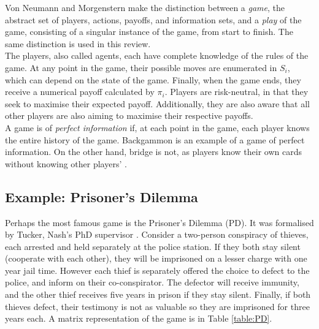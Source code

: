 

 Von Neumann and Morgenstern make the distinction between a \emph{game}, the abstract set of players, actions, payoffs, and information sets, and a \emph{play} of the game, consisting of a singular instance of the game, from start to finish. The same distinction is used in this review. \\



The players, also called agents, each have complete knowledge of the rules of the game. At any point in the game, their possible moves are enumerated in $S_i$, which can depend on the state of the game. Finally, when the game ends, they receive a numerical payoff calculated by $\pi_i$. Players are risk-neutral, in that they seek to maximise their expected payoff. Additionally, they are also aware that all other players are also aiming to maximise their respective payoffs.\\

A game is of \emph{perfect information} if, at each point in the game, each player knows the entire history of the game. Backgammon is an example of a game of perfect information. On the other hand, bridge is not, as players know their own cards without knowing other players' \cite{RN78}. \\


\subsection{Example: Prisoner's Dilemma} \label{PD}
Perhaps the most famous game is the Prisoner's Dilemma (PD). It was formalised by Tucker, Nash's PhD supervisor \cite{RN82}. Consider a two-person conspiracy of thieves, each arrested and held separately at the police station. If they both stay silent (cooperate with each other), they will be imprisoned on a lesser charge with one year jail time. However each thief is separately offered the choice to defect to the police, and inform on their co-conspirator. The defector will receive immunity, and the other thief receives five years in prison if they stay silent. Finally, if both thieves defect, their testimony is not as valuable so they are imprisoned for three years each. A matrix representation of the game is in Table \ref{table:PD}. 


